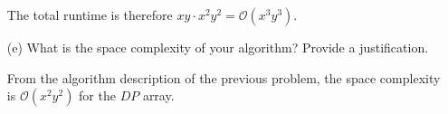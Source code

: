 \documentclass{article}
\begin{document}
\begin{itemize}
\begin{answer}
                The total runtime is therefore $xy \cdot x^{2}y^{2} = \mathcal{O}(x^{3} y^{3})$.
            \end{answer}

        \item [(e)] What is the space complexity of your algorithm? Provide a justification.
            \begin{answer}
                From the algorithm description of the previous problem, the space complexity is $\mathcal{O}(x^{2} y^{2})$ for the $DP$ array.
            \end{answer}
    \end{itemize}
\end{document}
